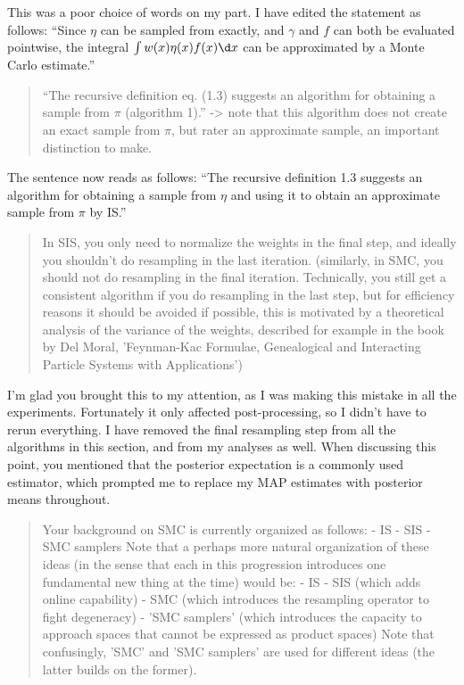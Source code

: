 \documentclass[12pt]{article}
\begin{document}
This was a poor choice of words on my part. I have edited the statement as
follows: ``Since $\eta$ can be sampled from exactly, and $\gamma$ and $f$ can
both be evaluated pointwise, the integral $\int w(x) \eta(x) f(x) \d x$ can be
approximated by a Monte Carlo estimate.''

\begin{quote}
  \itshape

  ``The recursive definition eq. (1.3) suggests an algorithm for obtaining a
  sample from $\pi$ (algorithm 1).'' -> note that this algorithm does not
  create an exact sample from $\pi$, but rater an approximate sample, an
  important distinction to make.
\end{quote}

The sentence now reads as follows: ``The recursive definition 1.3 suggests an
algorithm for obtaining a sample from $\eta$ and using it to obtain an
approximate sample from $\pi$ by IS.''

\begin{quote}
  \itshape

  In SIS, you only need to normalize the weights in the final step, and ideally
  you shouldn't do resampling in the last iteration. (similarly, in SMC, you
  should not do resampling in the final iteration. Technically, you still get a
  consistent algorithm if you do resampling in the last step, but for
  efficiency reasons it should be avoided if possible, this is motivated by a
  theoretical analysis of the variance of the weights, described for example in
  the book by Del Moral, 'Feynman-Kac Formulae, Genealogical and Interacting
  Particle Systems with Applications')
\end{quote}

I'm glad you brought this to my attention, as I was making this mistake in all
the experiments. Fortunately it only affected post-processing, so I didn't have
to rerun everything. I have removed the final resampling step from all the
algorithms in this section, and from my analyses as well. When discussing this
point, you mentioned that the posterior expectation is a commonly used
estimator, which prompted me to replace my MAP estimates with posterior means
throughout.

\begin{quote}
  \itshape

  Your background on SMC is currently organized as follows:
  - IS
  - SIS
  - SMC samplers
  Note that a perhaps more natural organization of these ideas (in the sense
  that each in this progression introduces one fundamental new thing at the
  time) would be:
  - IS
  - SIS (which adds online capability)
  - SMC (which introduces the resampling operator to fight degeneracy)
  - 'SMC samplers' (which introduces the capacity to approach spaces that
  cannot be expressed as product spaces)
  Note that confusingly, 'SMC' and 'SMC samplers' are used for different ideas
  (the latter builds on the former). 
\end{quote}
\end{document}
